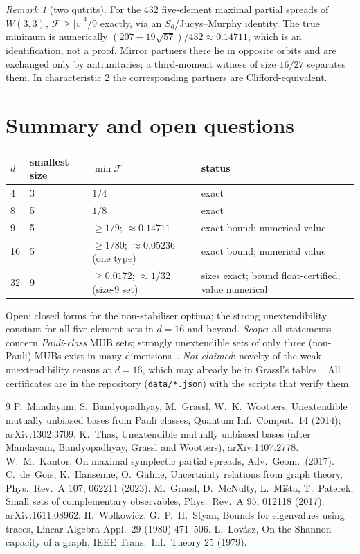 \documentclass[11pt]{article}
\theoremstyle{remark}\newtheorem*{remark}{Remark}
\newcommand{\F}{\mathcal{F}}
\begin{document}
\begin{remark}[two qutrits]
For the 432 five-element maximal partial spreads of $W(3,3)$, $\F\ge|v|^4/9$ exactly, via an $S_6$/Jucys--Murphy identity. The true
minimum is numerically $(207-19\sqrt{57})/432\approx0.14711$, which is an identification, not a proof. Mirror partners there lie in
opposite orbits and are exchanged only by antiunitaries; a third-moment witness of size $16/27$ separates them. In characteristic 2
the corresponding partners are Clifford-equivalent.
\end{remark}

\section{Summary and open questions}
\begin{center}
\begin{tabular}{llll}\toprule
$d$ & smallest size & $\min\F$ & status\\\midrule
4 & 3 & $1/4$ & exact\\
8 & 5 & $1/8$ & exact\\
9 & 5 & $\ge1/9$; $\approx0.14711$ & exact bound; numerical value\\
16 & 5 & $\ge1/80$; $\approx0.05236$ (one type) & exact bound; numerical value\\
32 & 9 & $\ge0.0172$; $\approx1/32$ (size-9 set) & sizes exact; bound float-certified; value numerical\\\bottomrule
\end{tabular}
\end{center}
Open: closed forms for the non-stabiliser optima; the strong
unextendibility constant for all five-element sets in $d=16$ and beyond. \emph{Scope}: all statements concern \emph{Pauli-class} MUB sets; strongly unextendible sets of only three (non-Pauli) MUBs exist in many dimensions~\cite{gmmp}. \emph{Not claimed}: novelty of the weak-unextendibility
census at $d=16$, which may already be in Grassl's tables~\cite{kantor}. All certificates are in the repository (\texttt{data/*.json})
with the scripts that verify them.

\begin{thebibliography}{9}
 P.~Mandayam, S.~Bandyopadhyay, M.~Grassl, W.~K.~Wootters, Unextendible mutually unbiased bases from Pauli classes,
Quantum Inf.\ Comput.\ 14 (2014); arXiv:1302.3709.
 K.~Thas, Unextendible mutually unbiased bases (after Mandayam, Bandyopadhyay, Grassl and Wootters), arXiv:1407.2778.
 W.~M.~Kantor, On maximal symplectic partial spreads, Adv.\ Geom.\ (2017).
 C.~de~Gois, K.~Hansenne, O.~G\"uhne, Uncertainty relations from graph theory, Phys.\ Rev.\ A 107, 062211 (2023).
 M.~Grassl, D.~McNulty, L.~Mi\v{s}ta, T.~Paterek, Small sets of complementary observables, Phys.\ Rev.\ A 95, 012118
(2017); arXiv:1611.08962.
 H.~Wolkowicz, G.~P.~H.~Styan, Bounds for eigenvalues using traces, Linear Algebra Appl.\ 29 (1980) 471--506.
 L.~Lov\'asz, On the Shannon capacity of a graph, IEEE Trans.\ Inf.\ Theory 25 (1979).
\end{thebibliography}
\end{document}
